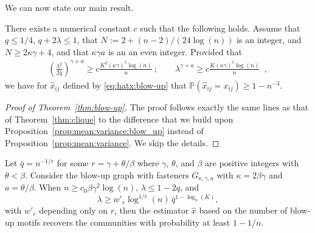 \documentclass[final]{colt2026}
\newcommand{\1}{\mathbf{1}}
\newcommand{\bbP}{\mathbb{P}}
\newcommand{\pa}[1]{\left(#1\right)}
\begin{document}
We can now state our main result.
\begin{theorem}\label{thm:blow-up}
There exists a numerical constant $c$ such that the following holds. 
Assume that $q\leq 1/4$, $q+2\lambda \leq 1$,  that $N:=2+(n-2)/(24\log(n))$ is an integer, and $N\geq 2\kappa \gamma + 4$, and that $\kappa \gamma a$ is an an even integer.  Provided that 
\begin{align*}
\left(\frac{\lambda^2}{2\bar q}  \right)^{\gamma + a} \geq c\frac{K^2(\kappa \gamma)^5 \log(n)}{n}\ ; \quad \quad    \lambda^{\gamma + a}\geq 
 c \frac{K(\kappa \gamma)^5\log(n) }{n}\enspace  , 
 \end{align*}
we have for $\hat x_{ij}$ defined by \eqref{eq:hatx:blow-up} that $\bbP\pa{\hat x_{ij}=x_{ij}}\geq 1-n^{-3}$. 
\end{theorem}

\begin{proof}[Proof of Theorem~\ref{thm:blow-up}]
The proof follows exactly the same lines as that of Theorem~\ref{thm:clique} 
to the difference that we build upon Proposition~\ref{prop:mean:variance:blow_up} instead of Proposition~\ref{prop:mean:variance}. We skip the details.
\end{proof}


\begin{corollary}\label{cor:blow-up}
Let  $\bar q=n^{-1/r}$ for some  $r= \gamma + \theta /\beta $ where  $\gamma$, $\theta $, and $\beta$ are positive integers with $\theta<\beta$. Consider the blow-up graph with fasteners $G_{\kappa,\gamma,a }$ with $\kappa = 2\beta\gamma$  and $a=\theta /\beta $. When $n\geq c_0 \beta\gamma^2  \log(n)$, $\lambda \leq 1-2q$, and 
\begin{equation}\label{eq:blow-up:final}
\lambda \geq w'_{r} \log^{1/r}(n) \,\bar q^{1-\log_{n}(K)},%
\end{equation}
with $w'_{r}$ depending only on $r$, then the  estimator $\hat{x}$ based on the number of blow-up motifs recovers the communities with probability at least $1-1/n$. 
\end{corollary}
\end{document}
